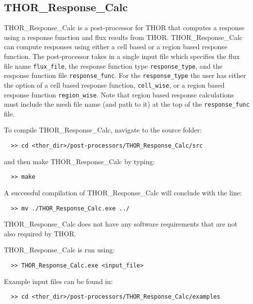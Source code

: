 \subsection{THOR\_Response\_Calc}

THOR\_Response\_Calc is a post-processor for THOR that computes a response using a response function and flux results from THOR.
THOR\_Response\_Calc can compute responses using either a cell based or a region based response function.
The post-processor takes in a single input file which specifies the flux file name \verb"flux_file", the response function type \verb"response_type", and the response function file \verb"response_func".
For the \verb"response_type" the user has either the option of a cell based response function, \verb"cell_wise", or a region based response function \verb"region_wise".
Note that region based response calculations must include the mesh file name (and path to it) at the top of the \verb"response_func" file.

To compile THOR\_Response\_Calc, navigate to the source folder:
\begin{verbatim}
  >> cd <thor_dir>/post-processors/THOR_Response_Calc/src
\end{verbatim}
and then make THOR\_Response\_Calc by typing:
\begin{verbatim}
  >> make
\end{verbatim}
A successful compilation of THOR\_Response\_Calc will conclude with the line:
\begin{verbatim}
  >> mv ./THOR_Response_Calc.exe ../
\end{verbatim}
THOR\_Response\_Calc does not have any software requirements that are not also required by \ac{THOR}.

THOR\_Response\_Calc is run using:
\begin{verbatim}
  >> THOR_Response_Calc.exe <input_file>
\end{verbatim}

Example input files can be found in:
\begin{verbatim}
  >> cd <thor_dir>/post-processors/THOR_Response_Calc/examples
\end{verbatim}

